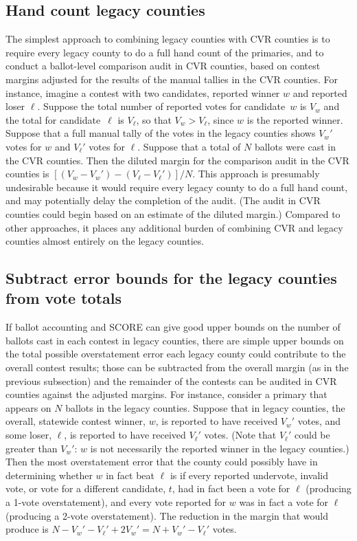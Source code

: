 \documentclass[12pt]{article}
\begin{document}
\subsection{Hand count legacy counties} \label{subsec:legacy-handcount}
The simplest approach to combining legacy counties with CVR counties is to require every
legacy county to do a full hand count of the primaries, and to conduct a 
ballot-level comparison audit in CVR counties, based on contest margins adjusted for
the results of the manual tallies in the CVR counties.
For instance, imagine a contest with two candidates, reported winner $w$ and reported loser $\ell$.
Suppose the total number of reported votes for candidate~$w$ is $V_w$ 
and the total for candidate~$\ell$ is $V_\ell$, so that $V_w > V_\ell$, since 
$w$ is the reported winner.
Suppose that a full manual tally of the votes in the legacy counties shows $V_w'$ votes for $w$ and
$V_\ell'$ votes for $\ell$.
Suppose that a total of $N$ ballots were cast in the CVR counties.
Then the diluted margin for the comparison audit in the CVR counties is 
$[(V_w-V_w')-(V_\ell-V_\ell')]/N$.
This approach is presumably undesirable because it would require every legacy county to do a full hand
count, and may potentially delay the completion of the audit. (The audit in CVR counties could begin 
based on an estimate of the diluted margin.) 
Compared to other approaches, it places any additional burden of combining CVR and legacy counties
almost entirely on the legacy counties.

\subsection{Subtract error bounds for the legacy counties from vote totals}
If ballot accounting and SCORE can give good upper bounds on the number of ballots cast in
each contest in legacy counties, there are simple upper bounds on the total
possible overstatement error each legacy county could contribute to the overall contest
results; those can be subtracted from the overall margin (as in the previous subsection) and the
remainder of the contests can be audited in CVR counties against the adjusted margins.
For instance, consider a primary that appears on $N$ ballots in the legacy counties.
Suppose that in legacy counties, the overall, statewide contest winner, $w$, 
is reported to have received $V_w'$ votes, and some loser, $\ell$, is reported to have received $V_\ell'$ votes. 
(Note that $V_\ell'$ could be greater than $V_w'$: $w$ is not necessarily the reported winner in the legacy counties.)
Then the most overstatement error that the county could possibly have in determining whether
$w$ in fact beat $\ell$ is if every reported undervote, invalid vote, or vote for a different candidate, $t$, had 
in fact been a vote for $\ell$ (producing a 1-vote overstatement), and every vote reported for 
$w$ was in fact a vote for $\ell$ (producing a 2-vote overstatement).
The reduction in the margin that would produce is 
$N - V_w' - V_\ell' + 2V_w' = N + V_w' - V_\ell'$ votes.
\end{document}
